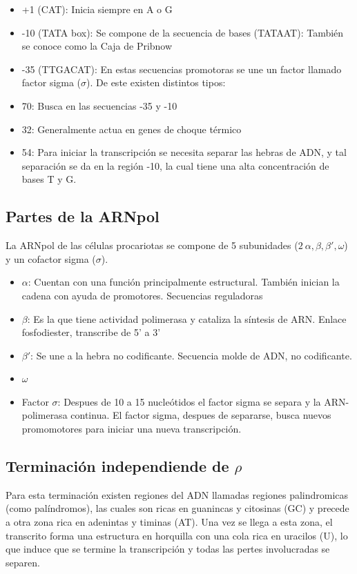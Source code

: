 \begin{itemize}
    \item +1 (CAT): Inicia siempre en A o G
    \item -10 (TATA box): Se compone de la secuencia de bases (TATAAT): También se conoce como la Caja de Pribnow
    \item -35 (TTGACAT): En estas secuencias promotoras se une un factor llamado factor sigma ($\sigma$). De este existen distintos tipos:
    \item 70: Busca en las secuencias -35 y -10
    \item 32: Generalmente actua en genes de choque térmico
    \item 54: Para iniciar la transcripción se necesita separar las hebras de ADN, y tal separación se da en la región -10, la cual tiene una alta concentración de bases T y G.
\end{itemize}

\subsection{Partes de la ARNpol}

La ARNpol de las células procariotas se compone de 5 subunidades ($2 \ \alpha, \beta , \beta ', \omega$) y un cofactor sigma ($\sigma$).

\begin{itemize}
    \item $\alpha$: Cuentan con una función principalmente estructural. También inician la cadena con ayuda de promotores. Secuencias reguladoras
    \item $\beta$: Es la que tiene actividad polimerasa y cataliza la síntesis de ARN. Enlace fosfodiester, transcribe de 5' a 3'
    \item $\beta '$: Se une a la hebra no codificante. Secuencia molde de ADN, no codificante.
    \item $\omega$
    \item Factor $\sigma$: Despues de 10 a 15 nucleótidos el factor sigma se separa y la ARN-polimerasa continua. El factor sigma, despues de separarse, busca nuevos promomotores para iniciar una nueva transcripción.
\end{itemize}

\subsection{Terminación independiende de $\rho$}

Para esta terminación existen regiones del ADN llamadas regiones palindromicas (como palíndromos), las cuales son ricas en guanincas y citosinas (GC) y precede a otra zona rica en adenintas y timinas (AT).
Una vez se llega a esta zona, el transcrito forma una estructura en horquilla con una cola rica en uracilos (U), lo que induce que se termine la transcripción y todas las pertes involucradas se separen.


